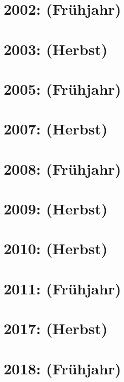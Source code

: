 \documentclass{lehramt-informatik-haupt}
\begin{document}
\section{2002: (Frühjahr)}


\section{2003: (Herbst)}


\section{2005: (Frühjahr)}


\section{2007: (Herbst)}


\section{2008: (Frühjahr)}


\section{2009: (Herbst)}


\section{2010: (Herbst)}


\section{2011: (Frühjahr)}


\section{2017: (Herbst)}


\section{2018: (Frühjahr)}

\end{document}
